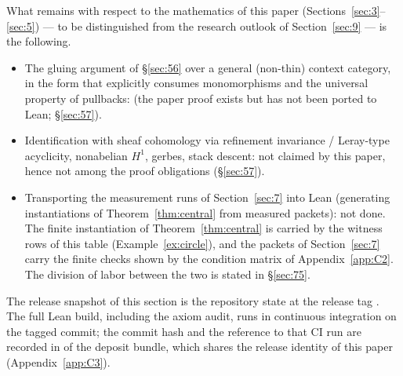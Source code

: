 What remains with respect to the mathematics of this paper
(Sections~\ref{sec:3}--\ref{sec:5}) --- to be distinguished from the
research outlook of Section~\ref{sec:9} --- is the following.
\begin{itemize}
\item The gluing argument of \S\ref{sec:56} over a general (non-thin)
context category, in the form that explicitly consumes monomorphisms
and the universal property of pullbacks:  (the paper
proof exists but has not been ported to Lean; \S\ref{sec:57}).
\item Identification with sheaf cohomology via refinement invariance /
Leray-type acyclicity, nonabelian $H^1$, gerbes, stack descent: not
claimed by this paper, hence not among the proof obligations
(\S\ref{sec:57}).
\item Transporting the measurement runs of Section~\ref{sec:7} into
Lean (generating instantiations of Theorem~\ref{thm:central} from
measured packets): not done. The finite instantiation of
Theorem~\ref{thm:central} is carried by the witness rows of this table
(Example~\ref{ex:circle}), and the packets of Section~\ref{sec:7} carry
the finite checks shown by the condition matrix of Appendix~\ref{app:C2}. The
division of labor between the two is stated in \S\ref{sec:75}.
\end{itemize}

The release snapshot of this section is the repository state at the
release tag . The full Lean build, including
the axiom audit, runs in continuous integration on the tagged commit;
the commit hash and the reference to that CI run are recorded in
 of the deposit bundle, which shares the release
identity of this paper (Appendix~\ref{app:C3}).
